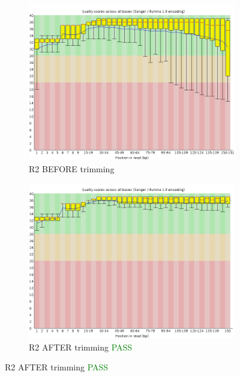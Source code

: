 \documentclass{article}
\begin{document}
\begin{figure}[!htb]
\begin{subfigure}{0.45\linewidth}
\includegraphics[width=\linewidth]{04-D15-22373-HT-Nextera-Myeloid-Val1-Repeat_S4_L001_R2_001_fastqc/Images/per_base_quality.png}
\caption{R2 BEFORE trimming}
\end{subfigure}
\begin{subfigure}{0.45\linewidth}
\includegraphics[width=\linewidth]{04-D15-22373-HT-Nextera-Myeloid-Val1-Repeat_S4_L001_R2_001.qfilter_fastqc/Images/per_base_quality.png}
\caption{R2 AFTER trimming \textcolor{green}{PASS}}
\end{subfigure}
\end{figure}
\end{document}
